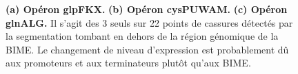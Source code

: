 \documentclass[12pt,a4paper]{report}
\begin{document}
\begin{figure}[h!]
\caption{\textbf{(a) Opéron glpFKX.} \textbf{(b) Opéron cysPUWAM.} \textbf{(c) Opéron glnALG.} Il s'agit des 3 seuls sur 22 points de cassures détectés par la segmentation tombant en dehors de la région génomique de la BIME. Le changement de niveau d'expression est probablement dû aux promoteurs et aux terminateurs plutôt qu'aux BIME.}
\end{figure}


\chapter{}
\label{annexeVenn}
\begin{figure}[h!]
\centering
{}

\end{figure}
\end{document}
